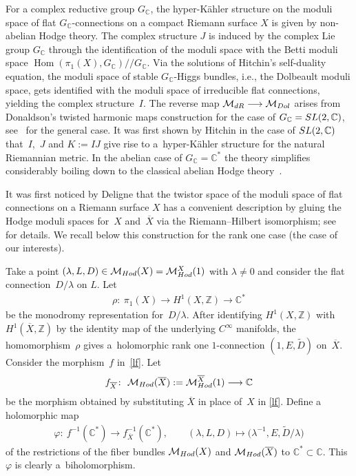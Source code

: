 \documentclass[11pt]{article}
\numberwithin{equation}{section}
\begin{document}
For a complex reductive group $G_{\mathbb C}$, the hyper-K\"ahler structure on the moduli space of f\/lat $G_{\mathbb C}$-connections on a compact Riemann surface $X$ is given by non-abelian Hodge theory. The complex structure $J$ is induced by the complex Lie group $G_{\mathbb C}$ through the identif\/ication of the moduli space with the Betti moduli space $\operatorname{Hom}(\pi_1(X), G_{\mathbb C})/\!\!/G_{\mathbb C}$. Via the solutions of Hitchin's self-duality equation, the moduli space of stable $G_{\mathbb C}$-Higgs bundles, i.e., the Dolbeault moduli space, gets identif\/ied with the moduli space of irreducible f\/lat connections, yielding the complex structure~$I$. The reverse map ${\mathcal M}_{dR}  \longrightarrow \mathcal M_{\rm Dol}$ arises from Donaldson's twisted harmonic maps construction \cite{Do} for the case of $G_{\mathbb C}={\rm SL }(2,\mathbb C)$, see~\cite{Co} for the general case. It was f\/irst shown by Hitchin in the case of ${\rm SL}(2,\mathbb C)$ that~$I$,~$J$ and $K := IJ$ give rise to a~hyper-K\"ahler structure for the natural Riemannian metric. In the abelian case of $G_{\mathbb C} = \mathbb C^*$ the theory simplif\/ies considerably boiling down to the classical abelian Hodge theory~\cite{GX}.

It was f\/irst noticed by Deligne that the twistor space of the moduli space of f\/lat connections on a Riemann surface $X$ has a convenient description by gluing the Hodge moduli spaces for~$X$ and~$\overline X$ via the Riemann--Hilbert isomorphism; see~\cite{Si95,Si08} for details. We recall below this construction for the rank one case (the case of our interests).

Take a point $(\lambda, L, D) \in \mathcal M_{\rm Hod}(X) = \mathcal M^X_{\rm Hod}(1)$ with $\lambda \neq 0$ and consider the f\/lat connec\-tion~$D/\lambda$ on $L$. Let
\begin{gather*}\rho \colon \ \pi_1(X)  \longrightarrow H^1(X, {\mathbb Z}) \longrightarrow \mathbb C^*\end{gather*}
be the monodromy representation for~$D/\lambda$. After identifying $H^1(X, {\mathbb Z})$ with $H^1(\overline{X}, {\mathbb Z})$ by the identity map of the underlying $C^\infty$ manifolds, the homomorphism~$\rho$ gives a~holomorphic rank one $1$-connection $(1, E, \widetilde D)$ on~$\overline{X}$. Consider the morphism~$f$ in~\eqref{lf}. Let
\begin{gather*}
f_{\overline X} \colon \ {\mathcal M}_{\rm Hod}(\overline{X}) := {\mathcal M}^{\overline X}_{\rm Hod}(1)  \longrightarrow {\mathbb C}
\end{gather*}
be the morphism obtained by substituting $\overline X$ in place of~$X$ in \eqref{lf}. Def\/ine a holomorphic map
\begin{gather}\label{hodge-gluing}
\varphi \colon \  f^{-1}({\mathbb C}^*)  \longrightarrow f^{-1}_{\overline X}({\mathbb C}^*) ,\qquad (\lambda, L, D) \longmapsto \big(\lambda^{-1}, E, \widetilde{D}/\lambda\big)
\end{gather}
of the restrictions of the f\/iber bundles ${\mathcal M}_{\rm Hod}(X)$ and ${\mathcal M}_{\rm Hod}(\overline{X})$ to ${\mathbb C}^* \subset \mathbb C$. This $\varphi$ is clearly a~biholomorphism.
\end{document}

